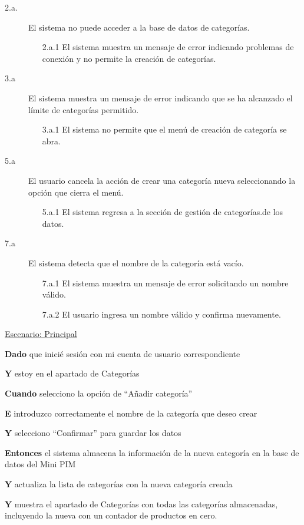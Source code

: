 \begin{description}
    \item[2.a.] El sistema no puede acceder a la base de datos de categorías.
    \begin{enumerate}
        \item[2.a.1] El sistema muestra un mensaje de error indicando problemas de conexión y no permite la creación de categorías.
    \end{enumerate}

    \item[3.a] El sistema muestra un mensaje de error indicando que se ha alcanzado el límite de categorías permitido.
    \begin{enumerate}
        \item[3.a.1] El sistema no permite que el menú de creación de categoría se abra.
    \end{enumerate}

    \item[5.a] El usuario cancela la acción de crear una categoría nueva seleccionando la opción que cierra el menú.
    \begin{enumerate}
        \item[5.a.1] El sistema regresa a la sección de gestión de categorías.de los datos.
    \end{enumerate}

    \item[7.a] El sistema detecta que el nombre de la categoría está vacío.
    \begin{enumerate}
        \item[7.a.1] El sistema muestra un mensaje de error solicitando un nombre válido.
        \item[7.a.2]El usuario ingresa un nombre válido y confirma nuevamente.
    \end{enumerate}
\end{description}

\underline{Escenario: Principal}\par
\vspace{0.15cm}
\textbf{Dado} que inicié sesión con mi cuenta de usuario correspondiente\par
\textbf{Y} estoy en el apartado de Categorías\par
\textbf{Cuando} selecciono la opción de “Añadir categoría”\par
\textbf{E} introduzco correctamente el nombre de la categoría que deseo crear\par
\textbf{Y} selecciono “Confirmar” para guardar los datos\par
\textbf{Entonces} el sistema almacena la información de la nueva categoría en la base de datos del Mini PIM\par
\textbf{Y} actualiza la lista de categorías con la nueva categoría creada\par
\textbf{Y} muestra el apartado de Categorías con todas las categorías almacenadas, incluyendo la nueva con un contador de productos en cero.\par

